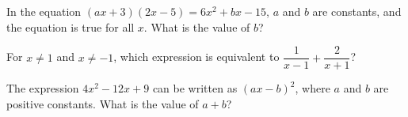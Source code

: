 \begin{exo}{\sprtag}
In the equation $(ax+3)(2x-5)=6x^2+bx-15$, $a$ and $b$ are constants, and the equation is true for all $x$. What is the value of $b$?
\end{exo}
\begin{exo}{}
For $x\neq1$ and $x\neq-1$, which expression is equivalent to $\dfrac{1}{x-1}+\dfrac{2}{x+1}$?
\end{exo}
\begin{exo}{\sprtag}
The expression $4x^2-12x+9$ can be written as $(ax-b)^2$, where $a$ and $b$ are positive constants. What is the value of $a+b$?
\end{exo}

